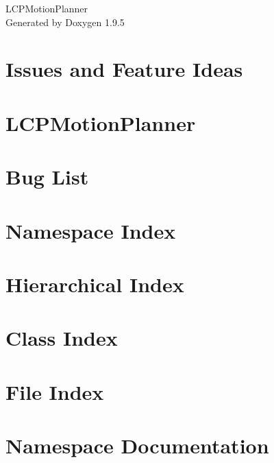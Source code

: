 \documentclass[twoside]{book}
\newcommand{\+}{\discretionary{\mbox{\scriptsize$\hookleftarrow$}}{}{}}
\newcommand{\clearemptydoublepage}{%
    \newpage{\pagestyle{empty}\cleardoublepage}%
  }
\begin{document}
  \raggedbottom
    \hypersetup{pageanchor=false,
                bookmarksnumbered=true,
                pdfencoding=unicode
               }
  \begin{titlepage}
  \vspace*{7cm}
  \begin{center}%
  {\Large LCPMotion\+Planner}\\
  \vspace*{1cm}
  {\large Generated by Doxygen 1.9.5}\\
  \end{center}
  \end{titlepage}
  \clearemptydoublepage
  \tableofcontents
  \clearemptydoublepage
  \hypersetup{pageanchor=true}
\chapter{Issues and Feature Ideas}
\label{md_docs_issues}

\chapter{LCPMotion\+Planner}
\label{md__r_e_a_d_m_e}

\chapter{Bug List}
\label{bug}

\chapter{Namespace Index}

\chapter{Hierarchical Index}

\chapter{Class Index}

\chapter{File Index}

\chapter{Namespace Documentation}



\end{document}
